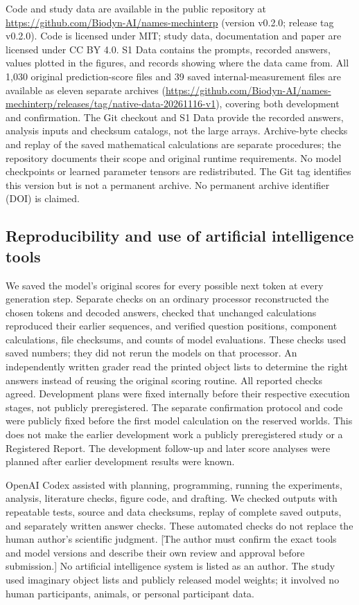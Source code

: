 \documentclass[10pt,letterpaper]{article}
\begin{document}
Code and study data are available in the public repository at \url{https://github.com/Biodyn-AI/names-mechinterp} (version v0.2.0; release tag v0.2.0). Code is licensed under MIT; study data, documentation and paper are licensed under CC BY 4.0. S1 Data contains the prompts, recorded answers, values plotted in the figures, and records showing where the data came from. All 1,030 original prediction-score files and 39 saved internal-measurement files are available as eleven separate archives (\url{https://github.com/Biodyn-AI/names-mechinterp/releases/tag/native-data-20261116-v1}), covering both development and confirmation. The Git checkout and S1 Data provide the recorded answers, analysis inputs and checksum catalogs, not the large arrays. Archive-byte checks and replay of the saved mathematical calculations are separate procedures; the repository documents their scope and original runtime requirements. No model checkpoints or learned parameter tensors are redistributed. The Git tag identifies this version but is not a permanent archive. No permanent archive identifier (DOI) is claimed.


\subsection*{Reproducibility and use of artificial intelligence tools}

We saved the model's original scores for every possible next token at every generation step. Separate checks on an ordinary processor reconstructed the chosen tokens and decoded answers, checked that unchanged calculations reproduced their earlier sequences, and verified question positions, component calculations, file checksums, and counts of model evaluations. These checks used saved numbers; they did not rerun the models on that processor. An independently written grader read the printed object lists to determine the right answers instead of reusing the original scoring routine. All reported checks agreed. Development plans were fixed internally before their respective execution stages, not publicly preregistered. The separate confirmation protocol and code were publicly fixed before the first model calculation on the reserved worlds. This does not make the earlier development work a publicly preregistered study or a Registered Report. The development follow-up and later score analyses were planned after earlier development results were known.


OpenAI Codex assisted with planning, programming, running the experiments, analysis, literature checks, figure code, and drafting. We checked outputs with repeatable tests, source and data checksums, replay of complete saved outputs, and separately written answer checks. These automated checks do not replace the human author's scientific judgment. [The author must confirm the exact tools and model versions and describe their own review and approval before submission.] No artificial intelligence system is listed as an author. The study used imaginary object lists and publicly released model weights; it involved no human participants, animals, or personal participant data.
\end{document}
